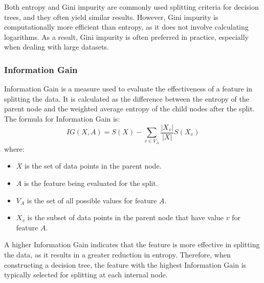 \begin{observacion}
    Both entropy and Gini impurity are commonly used splitting criteria for decision trees, and they often yield similar results. However, Gini impurity is computationally more efficient than entropy, as it does not involve calculating logarithms. As a result, Gini impurity is often preferred in practice, especially when dealing with large datasets.
\end{observacion}

\subsubsection{Information Gain}
Information Gain is a measure used to evaluate the effectiveness of a feature in splitting the data. It is calculated as the difference between the entropy of the parent node and the weighted average entropy of the child nodes after the split. The formula for Information Gain is:
\begin{equation*}
    IG(X, A) = S(X) - \sum_{v\in V_A} \frac{|X_v|}{|X|} S(X_v)
\end{equation*}
where:
\begin{itemize}
    \item $X$ is the set of data points in the parent node.
    \item $A$ is the feature being evaluated for the split.
    \item $V_A$ is the set of all possible values for feature $A$.
    \item $X_v$ is the subset of data points in the parent node that have value $v$ for feature $A$.
\end{itemize}

A higher Information Gain indicates that the feature is more effective in splitting the data, as it results in a greater reduction in entropy. Therefore, when constructing a decision tree, the feature with the highest Information Gain is typically selected for splitting at each internal node.

